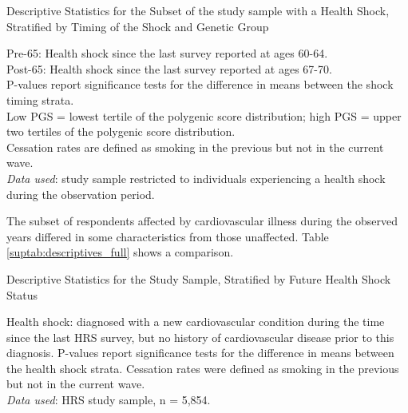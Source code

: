 \begin{table}[!ht] \centering
	\caption{Descriptive Statistics for the Subset of the study sample with a Health Shock, Stratified by Timing of the Shock and Genetic Group}
	\label{suptab:descriptive_subgroup}
	
	\begin{flushleft}
			\footnotesize
			Pre-65: Health shock since the last survey reported at ages 60-64.\\
			Post-65: Health shock since the last survey reported at ages 67-70.\\
			P-values report significance tests for the difference in means between the shock timing strata.\\
			Low PGS = lowest tertile of the polygenic score distribution; high PGS = upper two tertiles of the polygenic score distribution.\\
			Cessation rates are defined as smoking in the previous but not in the current wave.\\
			\textit{Data used}: study sample restricted to individuals experiencing a health shock during the observation period.
	\end{flushleft}
\end{table}

The subset of respondents affected by cardiovascular illness during the observed years differed in some characteristics from those unaffected.
Table \ref{suptab:descriptives_full} shows a comparison.

\begin{table}[ht] \centering
	\vspace{-3mm}
	\caption{Descriptive Statistics for the Study Sample, Stratified by Future Health Shock Status}
	\label{suptab:descriptives_full}
	\resizebox{\textwidth}{!}{
	
	}
	\begin{flushleft}
	Health shock: diagnosed with a new cardiovascular condition during the time since the last HRS survey, but no history of cardiovascular disease prior to this diagnosis.
	P-values report significance tests for the difference in means between the health shock strata.
	Cessation rates were defined as smoking in the previous but not in the current wave.\\
	\textit{Data used}: HRS study sample, n = 5,854.
	\end{flushleft}
\end{table}

